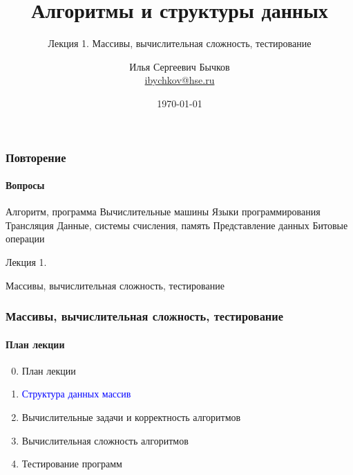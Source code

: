\documentclass[aspectratio=169]{beamer}
\title[Title]{Алгоритмы и структуры данных}
\subtitle{Лекция 1. Массивы, вычислительная сложность, тестирование}
\author[Author's name]{Илья Сергеевич Бычков\\ \smallskip \scriptsize \url{ibychkov@hse.ru}}
\institute{НИУ ВШЭ - Нижний Новгород}
\date{\today}
\begin{document}
\frame[plain]{\titlepage}


\begin{frame}
\frametitle{Повторение}
\framesubtitle{Вопросы}
Алгоритм, программа\newline\newline
Вычислительные машины\newline\newline
Языки программирования\newline\newline
Трансляция\newline\newline
Данные, системы счисления, память\newline\newline
Представление данных \newline\newline
Битовые операции\newline\newline
\end{frame}

\begin{frame}[c]

\begin{center}
\Huge Лекция 1.

\Huge Массивы, вычислительная сложность, тестирование
\end{center}

\end{frame}

\begin{frame}
\frametitle{Массивы, вычислительная сложность, тестирование}
\framesubtitle{План лекции}

\begin{enumerate}
  \setcounter{enumi}{-1}
  \item{План лекции}
  \item{\textcolor{blue}{Структура данных массив}}
  \item{Вычислительные задачи и корректность алгоритмов}
  \item{Вычислительная сложность алгоритмов}
  \item{Тестирование программ}
\end{enumerate}
\end{frame}
\end{document}
